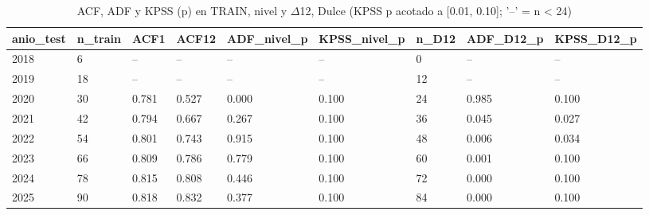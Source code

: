 \begin{table}[H]
\centering
\small
\caption{ACF, ADF y KPSS (p) en TRAIN, nivel y $\Delta$12, Dulce (KPSS p acotado a [0.01, 0.10]; '--' = n < 24)}
\label{tab:T04_estacionariedad_dulce}
\begin{tabular}{lllllllll}
\toprule
anio\_test & n\_train & ACF1 & ACF12 & ADF\_nivel\_p & KPSS\_nivel\_p & n\_D12 & ADF\_D12\_p & KPSS\_D12\_p \\
\midrule
2018 & 6 & -- & -- & -- & -- & 0 & -- & -- \\
2019 & 18 & -- & -- & -- & -- & 12 & -- & -- \\
2020 & 30 & 0.781 & 0.527 & 0.000 & 0.100 & 24 & 0.985 & 0.100 \\
2021 & 42 & 0.794 & 0.667 & 0.267 & 0.100 & 36 & 0.045 & 0.027 \\
2022 & 54 & 0.801 & 0.743 & 0.915 & 0.100 & 48 & 0.006 & 0.034 \\
2023 & 66 & 0.809 & 0.786 & 0.779 & 0.100 & 60 & 0.001 & 0.100 \\
2024 & 78 & 0.815 & 0.808 & 0.446 & 0.100 & 72 & 0.000 & 0.100 \\
2025 & 90 & 0.818 & 0.832 & 0.377 & 0.100 & 84 & 0.000 & 0.100 \\
\bottomrule
\end{tabular}
\end{table}
